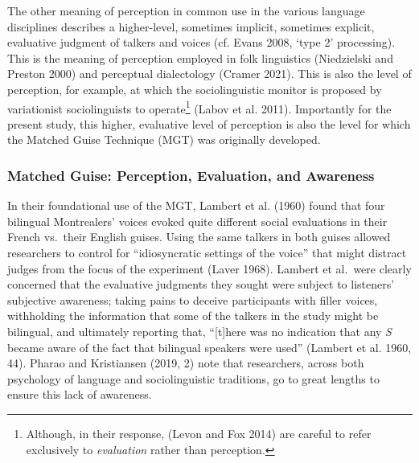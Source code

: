 \documentclass[
  letterpaper,
  DIV=11,
  numbers=noendperiod]{scrartcl}
\begin{document}
The other meaning of perception in common use in the various language
disciplines describes a higher-level, sometimes implicit, sometimes
explicit, evaluative judgment of talkers and voices (cf. Evans 2008,
`type 2' processing). This is the meaning of perception employed in folk
linguistics (Niedzielski and Preston 2000) and perceptual dialectology
(Cramer 2021). This is also the level of perception, for example, at
which the sociolinguistic monitor is proposed by variationist
sociolinguists to operate\footnote{Although, in their response, (Levon
  and Fox 2014) are careful to refer exclusively to \emph{evaluation}
  rather than perception.} (Labov et al. 2011). Importantly for the
present study, this higher, evaluative level of perception is also the
level for which the Matched Guise Technique (MGT) was originally
developed.

\subsubsection{Matched Guise: Perception, Evaluation, and
Awareness}\label{sec-mgt}

In their foundational use of the MGT, Lambert et al. (1960) found that
four bilingual Montrealers' voices evoked quite different social
evaluations in their French vs.~their English guises. Using the same
talkers in both guises allowed researchers to control for
``idiosyncratic settings of the voice'' that might distract judges from
the focus of the experiment (Laver 1968). Lambert et al.~were clearly
concerned that the evaluative judgments they sought were subject to
listeners' subjective awareness; taking pains to deceive participants
with filler voices, withholding the information that some of the talkers
in the study might be bilingual, and ultimately reporting that,
``{[}t{]}here was no indication that any \emph{S} became aware of the
fact that bilingual speakers were used'' (Lambert et al. 1960, 44).
Pharao and Kristiansen (2019, 2) note that researchers, across both
psychology of language and sociolinguistic traditions, go to great
lengths to ensure this lack of awareness.
\end{document}
